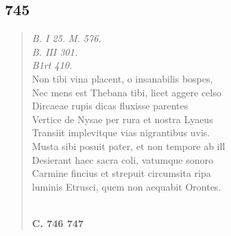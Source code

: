 \documentclass[11pt, a4paper]{report}
\begin{document}
            \subsection*{745}
      \begin{verse}
      \textit{B. I 25. M. 576.} \\ \textit{B. III 301.} \\ \textit{B1rt 410.} \\ Non tibi vina placent, o insanabilis bospes, \\ Nec mens est Thebana tibi, licet aggere celso \\ Dircaeae rupis dicas fluxisse parentes \\ Vertice de Nysae per rura et nostra Lyaeus \\ Transiit implevitque vias nigrantibus uvis. \\ Musta sibi posuit pater, et non tempore ab ill \\ Desierant haec sacra coli, vatumque sonoro \\ Carmine fincius et strepuit circumsita ripa \\ luminis Etrusci, quem non aequabit Orontes. \\ 
        ﻿\pagebreak 
    \begin{center} \textbf{C. 746 747} \end{center} \marginpar{[01]} 
      \end{verse}
  
\end{document}
